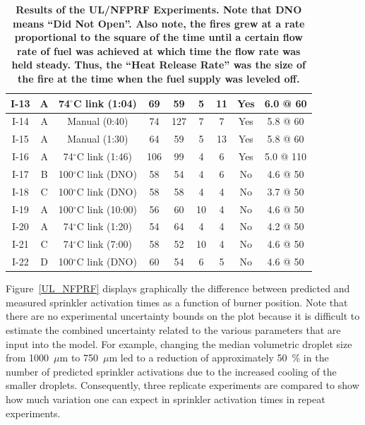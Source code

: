 \begin{table}[h!]
\begin{center}
\begin{tabular}{|c||c|c|c|c|c|c|c|c|}
I-13  & A  & 74$^\circ$C link (1:04)    & 69   & 59                             & 5    & 11     & Yes  & 6.0 @ 60  \\ \hline
I-14  & A  & Manual (0:40)              & 74   & 127                            & 7    & 7      & Yes  & 5.8 @ 60  \\ \hline
I-15  & A  & Manual (1:30)              & 64   & 59                             & 5    & 13     & Yes  & 5.8 @ 60  \\ \hline
I-16  & A  & 74$^\circ$C link (1:46)    & 106  & 99                             & 4    & 6      & Yes  & 5.0 @ 110 \\ \hline \hline
I-17  & B  & 100$^\circ$C link (DNO)    & 58   & 54                             & 4    & 6      & No   & 4.6 @ 50 \\ \hline
I-18  & C  & 100$^\circ$C link (DNO)    & 58   & 58                             & 4    & 4      & No   & 3.7 @ 50 \\ \hline
I-19  & A  & 100$^\circ$C link (10:00)  & 56   & 60                             & 10   & 4      & No   & 4.6 @ 50 \\ \hline
I-20  & A  & 74$^\circ$C link (1:20)    & 54   & 64                             & 4    & 4      & No   & 4.2 @ 50 \\ \hline
I-21  & C  & 74$^\circ$C link (7:00)    & 58   & 52                             & 10   & 4      & No   & 4.6 @ 50 \\ \hline
I-22  & D  & 100$^\circ$C link (DNO)    & 60   & 54                             & 6    & 5      & No   & 4.6 @ 50 \\ \hline
\end{tabular}
\end{center}
\caption[Results of the UL/NFPRF Experiments.]
{\bf Results of the UL/NFPRF Experiments. Note that DNO means
``Did Not Open''. Also note, the fires grew at a rate proportional
to the square of the time until a certain flow rate of fuel was achieved
at which time the flow rate was held steady. Thus, the ``Heat Release Rate''
was the size of the fire at the time when the fuel supply was leveled off.}
\label{ULmatrix}
\end{table}

Figure~\ref{UL_NFPRF} displays graphically the difference between predicted and measured sprinkler activation times as a function of
burner position. Note that there are no experimental uncertainty bounds on the plot because it is difficult to estimate the
combined uncertainty related to the various parameters that are input into the model. For example, changing the median volumetric droplet
size from 1000~$\mu$m to 750~$\mu$m led to a reduction of approximately 50~\% in the number of predicted sprinkler activations due to the
increased cooling of the smaller droplets. Consequently, three replicate experiments are compared to show how much variation one can expect in
sprinkler activation times in repeat experiments.

